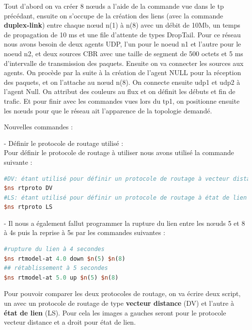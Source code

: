 \documentclass[11pt]{article}
\begin{document}
Tout d'abord on va créer 8 nœuds a l'aide de la commande vue dans le tp précédant, ensuite on s'occupe de la création des liens (avec la commande \textbf{duplex-link}) entre chaque nœud n(1) à n(8) avec un débit de 10Mb, un temps de propagation de 10 ms et une file d’attente de types DropTail. Pour ce réseau nous avons besoin de deux agents UDP, l’un pour le noeud n1 et l’autre pour le noeud n2, et deux sources CBR avec une taille de segment de 500 octets et 5 ms d’intervalle de transmission des paquets. Ensuite on va connecter les sources aux agents. On procède par la suite à la création de l’agent NULL pour la réception des paquets, et on l'attache au nœud n(8). On connecte ensuite udp1 et udp2 à l'agent Null. On attribut des couleurs au flux et on définit les débuts et fin de trafic. Et pour finir avec les commandes vues lors du tp1, on positionne ensuite les nœuds pour que le réseau ait l’apparence de la topologie demandé. 

\noindent
Nouvelles commandes :

- Définir le protocole de routage utilisé :\\
Pour définir le protocole de routage à utiliser nous avons utilisé la commande suivante :

\begin{lstlisting}[language=tcl, numbers=none, framexleftmargin=0pt, 	framextopmargin=0pt, framexbottommargin=0pt]
#DV: étant utilisé pour définir un protocole de routage à vecteur distance
$ns rtproto DV
#LS: étant utilisé pour définir un protocole de routage à état de lien
$ns rtproto LS
\end{lstlisting}

- Il nous a également fallut programmer la rupture du lien entre les nœuds 5 et 8 à 4s puis la reprise à 5s par les commandes suivantes :

\begin{lstlisting}[language=tcl, numbers=none, framexleftmargin=0pt, 	framextopmargin=0pt, framexbottommargin=0pt]
#rupture du lien à 4 secondes
$ns rtmodel-at 4.0 down $n(5) $n(8)
## rétablissement à 5 secondes
$ns rtmodel-at 5.0 up $n(5) $n(8)
\end{lstlisting}

Pour pouvoir comparer les deux protocoles de routage, on va écrire deux script, un avec un protocole de routage de type \textbf{vecteur distance} (DV) et l'autre à \textbf{état de lien} (LS). Pour cela les images a gauches seront pour le protocole vecteur distance et a droit pour état de lien.\\
\end{document}
